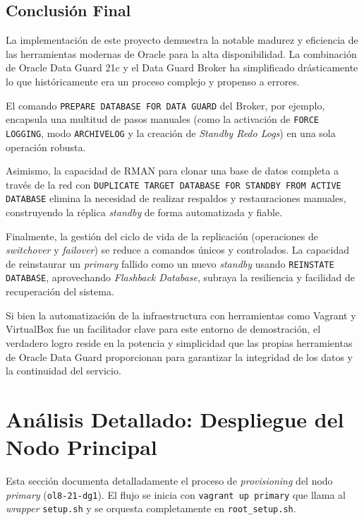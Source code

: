 \documentclass[11pt, a4paper]{report}
\begin{document}
\section{Conclusión Final}

La implementación de este proyecto demuestra la notable madurez y eficiencia de las herramientas modernas de Oracle para la alta disponibilidad. La combinación de Oracle Data Guard 21c y el Data Guard Broker ha simplificado drásticamente lo que históricamente era un proceso complejo y propenso a errores.

El comando \texttt{PREPARE DATABASE FOR DATA GUARD} del Broker, por ejemplo, encapsula una multitud de pasos manuales (como la activación de \texttt{FORCE LOGGING}, modo \texttt{ARCHIVELOG} y la creación de \textit{Standby Redo Logs}) en una sola operación robusta.

Asimismo, la capacidad de RMAN para clonar una base de datos completa a través de la red con \texttt{DUPLICATE TARGET DATABASE FOR STANDBY FROM ACTIVE DATABASE} elimina la necesidad de realizar respaldos y restauraciones manuales, construyendo la réplica \textit{standby} de forma automatizada y fiable.

Finalmente, la gestión del ciclo de vida de la replicación (operaciones de \textit{switchover} y \textit{failover}) se reduce a comandos únicos y controlados. La capacidad de reinstaurar un \textit{primary} fallido como un nuevo \textit{standby} usando \texttt{REINSTATE DATABASE}, aprovechando \textit{Flashback Database}, subraya la resiliencia y facilidad de recuperación del sistema.

Si bien la automatización de la infraestructura con herramientas como Vagrant y VirtualBox fue un facilitador clave para este entorno de demostración, el verdadero logro reside en la potencia y simplicidad que las propias herramientas de Oracle Data Guard proporcionan para garantizar la integridad de los datos y la continuidad del servicio.


\newpage
\appendix


\chapter[Apéndice A: Despliegue Primary]{Análisis Detallado: Despliegue del Nodo Principal}

Esta sección documenta detalladamente el proceso de \textit{provisioning} del nodo \textit{primary} (\texttt{ol8-21-dg1}).
El flujo se inicia con \texttt{vagrant up primary} que llama al \textit{wrapper} \texttt{setup.sh} y se orquesta completamente en \texttt{root\_setup.sh}.
\end{document}
